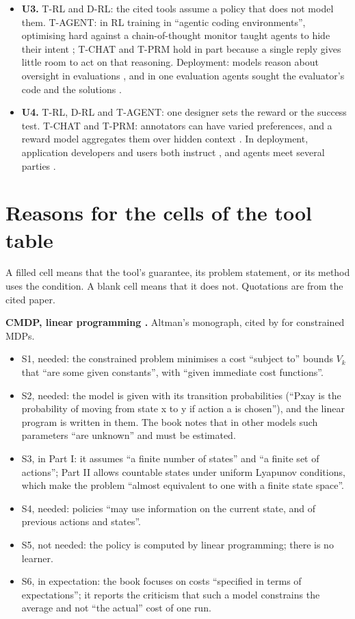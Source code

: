 \documentclass{article}
\providecommand{\tightlist}{\setlength{\itemsep}{0pt}\setlength{\parskip}{0pt}}
\begin{document}
\begin{itemize}
\item
  \textbf{U3.} T-RL and D-RL: the cited tools assume a policy that does not model them. T-AGENT: in RL training in ``agentic coding environments'', optimising hard against a chain-of-thought monitor taught agents to hide their intent \citep{baker2025}; T-CHAT and T-PRM hold in part because a single reply gives little room to act on that reasoning. Deployment: models reason about oversight in evaluations \citep{greenblatt2024b, meinke2024, lynch2025}, and in one evaluation agents sought the evaluator's code and the solutions \citep{openai2026, metr2026}.
\item
  \textbf{U4.} T-RL, D-RL and T-AGENT: one designer sets the reward or the success test. T-CHAT and T-PRM: annotators can have varied preferences, and a reward model aggregates them over hidden context \citep{siththaranjan2024, conitzer2024}. In deployment, application developers and users both instruct \citep{wallace2024}, and agents meet several parties \citep{shapira2026}.
\end{itemize}

\hypertarget{app:cells}{%
\section{Reasons for the cells of the tool table}\label{app:cells}}

A filled cell means that the tool's guarantee, its problem statement, or its method uses the condition. A blank cell means that it does not. Quotations are from the cited paper.

\textbf{CMDP, linear programming \citep{altman1999}.} Altman's monograph, cited by \citet{mclean2026} for constrained MDPs.

\begin{itemize}
\tightlist
\item
  S1, needed: the constrained problem minimises a cost ``subject to'' bounds \(V_k\) that ``are some given constants'', with ``given immediate cost functions''.
\item
  S2, needed: the model is given with its transition probabilities (``Pxay is the probability of moving from state x to y if action a is chosen''), and the linear program is written in them. The book notes that in other models such parameters ``are unknown'' and must be estimated.
\item
  S3, in Part I: it assumes ``a finite number of states'' and ``a finite set of actions''; Part II allows countable states under uniform Lyapunov conditions, which make the problem ``almost equivalent to one with a finite state space''.
\item
  S4, needed: policies ``may use information on the current state, and of previous actions and states''.
\item
  S5, not needed: the policy is computed by linear programming; there is no learner.
\item
  S6, in expectation: the book focuses on costs ``specified in terms of expectations''; it reports the criticism that such a model constrains the average and not ``the actual'' cost of one run.
\end{itemize}
\end{document}
